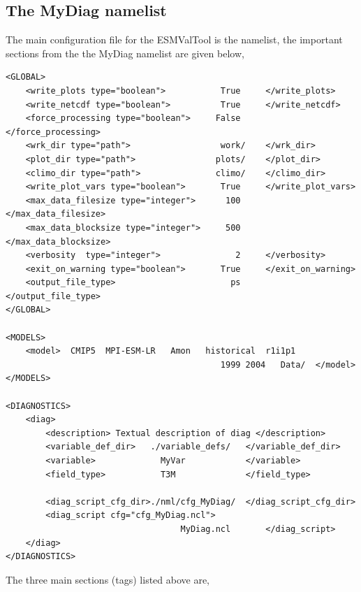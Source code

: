 \documentclass[12pt]{article}
\begin{document}
\subsection{The MyDiag namelist}\label{subsection:mydiag_namelist}
The main configuration file for the ESMValTool is the namelist, the
important sections from the the MyDiag namelist are given below, 
\begin{Verbatim}[frame=single, fontsize=\footnotesize]
<GLOBAL>
    <write_plots type="boolean">           True     </write_plots>
    <write_netcdf type="boolean">          True     </write_netcdf>
    <force_processing type="boolean">     False     </force_processing>
    <wrk_dir type="path">                  work/    </wrk_dir>
    <plot_dir type="path">                plots/    </plot_dir>
    <climo_dir type="path">               climo/    </climo_dir>
    <write_plot_vars type="boolean">       True     </write_plot_vars>
    <max_data_filesize type="integer">      100     </max_data_filesize>
    <max_data_blocksize type="integer">     500     </max_data_blocksize>
    <verbosity  type="integer">               2     </verbosity>
    <exit_on_warning type="boolean">       True     </exit_on_warning>
    <output_file_type>                       ps     </output_file_type>
</GLOBAL>

<MODELS>
    <model>  CMIP5  MPI-ESM-LR   Amon   historical  r1i1p1
                                           1999 2004   Data/  </model>
</MODELS>

<DIAGNOSTICS>
    <diag>
        <description> Textual description of diag </description>
        <variable_def_dir>   ./variable_defs/   </variable_def_dir>
        <variable>             MyVar            </variable>
        <field_type>           T3M              </field_type>

        <diag_script_cfg_dir>./nml/cfg_MyDiag/  </diag_script_cfg_dir>
        <diag_script cfg="cfg_MyDiag.ncl"> 
                                   MyDiag.ncl       </diag_script>
    </diag>
</DIAGNOSTICS>
\end{Verbatim}
The three main sections (tags) listed above are,
\end{document}
